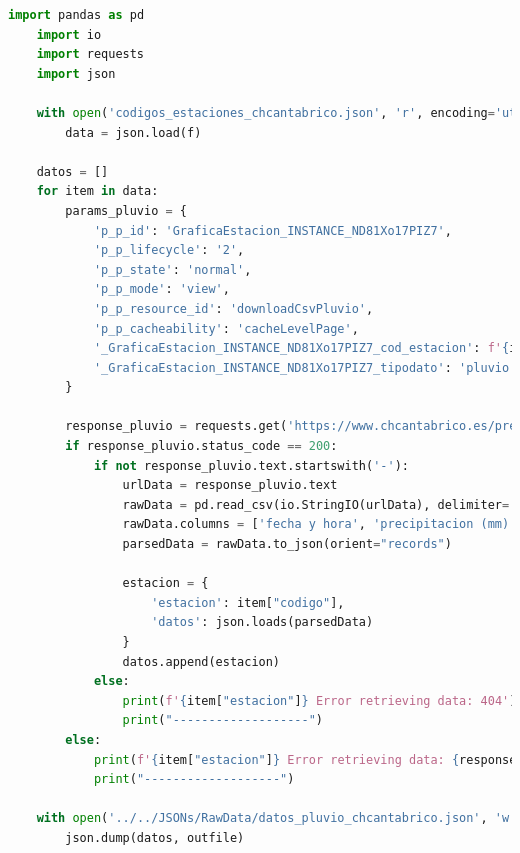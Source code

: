 \begin{lstlisting}[language=Python, caption={Script de obtención de datos pluviometricos descartado}]
	import pandas as pd
	import io
	import requests
	import json
	
	with open('codigos_estaciones_chcantabrico.json', 'r', encoding='utf-8') as f:
		data = json.load(f)
		
	datos = []
	for item in data:
		params_pluvio = {
			'p_p_id': 'GraficaEstacion_INSTANCE_ND81Xo17PIZ7',
			'p_p_lifecycle': '2',
			'p_p_state': 'normal',
			'p_p_mode': 'view',
			'p_p_resource_id': 'downloadCsvPluvio',
			'p_p_cacheability': 'cacheLevelPage',
			'_GraficaEstacion_INSTANCE_ND81Xo17PIZ7_cod_estacion': f'{item["codigo"]}',
			'_GraficaEstacion_INSTANCE_ND81Xo17PIZ7_tipodato': 'pluvio',
		}
		
		response_pluvio = requests.get('https://www.chcantabrico.es/precipitacion-acumulada', params=params_pluvio)
		if response_pluvio.status_code == 200:
			if not response_pluvio.text.startswith('-'):
				urlData = response_pluvio.text
				rawData = pd.read_csv(io.StringIO(urlData), delimiter=';', encoding='utf-8', header=1)
				rawData.columns = ['fecha y hora', 'precipitacion (mm)']
				parsedData = rawData.to_json(orient="records")
				
				estacion = {
					'estacion': item["codigo"],
					'datos': json.loads(parsedData)
				}
				datos.append(estacion)
			else:
				print(f'{item["estacion"]} Error retrieving data: 404')
				print("-------------------")
		else:
			print(f'{item["estacion"]} Error retrieving data: {response_pluvio.status_code}')
			print("-------------------")
	
	with open('../../JSONs/RawData/datos_pluvio_chcantabrico.json', 'w', encoding='utf-8') as outfile:
		json.dump(datos, outfile)
\end{lstlisting}

